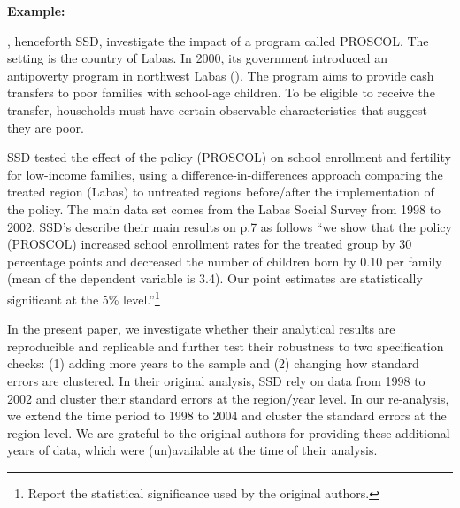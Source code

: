 \documentclass[12pt,a4paper]{article}
\begin{document}

\textbf{Example:} 

\cite{analyst_2022}, henceforth SSD, investigate the impact of a program called PROSCOL. The setting is the country of Labas. In 2000, its government introduced an antipoverty program in northwest Labas (\cite{ravallion2001mystery}). The program aims to provide cash transfers to poor families with school-age children. To be eligible to receive the transfer, households must have certain observable characteristics that suggest they are poor.

SSD tested the effect of the policy (PROSCOL) on school enrollment and fertility for low-income families, using a difference-in-differences approach comparing the treated region (Labas) to untreated regions before/after the implementation of the policy. The main data set comes from the Labas Social Survey from 1998 to 2002. SSD’s describe their main results on p.7 as follows “we show that the policy (PROSCOL) increased school enrollment rates for the treated group by 30 percentage points and decreased the number of children born by 0.10 per family (mean of the dependent variable is 3.4). Our point estimates are statistically significant at the 5\% level.”\footnote{Report the statistical significance used by the original authors.}

In the present paper, we investigate whether their analytical results are reproducible and replicable and further test their robustness to two specification checks: (1) adding more years to the sample and (2) changing how standard errors are clustered. In their original analysis, SSD rely on data from 1998 to 2002 and cluster their standard errors at the region/year level. In our re-analysis, we extend the time period to 1998 to 2004 and cluster the standard errors at the region level. We are grateful to the original authors for providing these additional years of data, which were (un)available at the time of their analysis.
\end{document}

